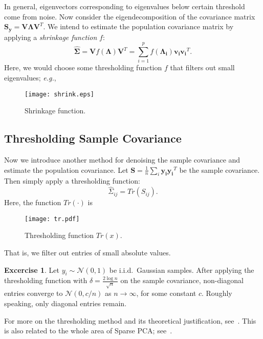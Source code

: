 \documentclass[11pt]{article}
\theoremstyle{definition}
\newtheorem{excercise}{Excercise}
\begin{document}
In general, eigenvectors corresponding to eigenvalues below certain threshold come from noise. Now consider the eigendecomposition of the covariance matrix $\mathbf{S_y} = \mathbf{V}\bm{\Lambda} \mathbf{V}^T$. We intend to estimate the population covariance matrix by  applying a {\it shrinkage function} $f$:
\[
    \bm{ \widehat{\Sigma} }= \mathbf{V}f(\bm{\Lambda})\mathbf{V}^T = \sum_{i=1}^p f(\bm{\Lambda_i})\mathbf{v_i} \mathbf{v_i}^T.
\]
Here, we would choose some thresholding function $f$ that filters out small eigenvalues; \textit{e.g.},
\begin{figure}[htbp]
    \centering
    \texttt{[image: shrink.eps]}
    \caption{Shrinkage function.}
\end{figure}

\subsection{Thresholding Sample Covariance}
Now we introduce another method for denoising the sample covariance and estimate the population covariance. Let $\mathbf{S}= \frac{1}{n}\sum_{i}\mathbf{y_i}\mathbf{y_i}^T$ be the sample covariance. Then simply apply a thresholding function: $$\widehat{\Sigma}_{ij} = Tr(S_{ij}).$$ Here, the function $Tr(\cdot)$ is 
\begin{figure}[htbp]
    \centering
    \texttt{[image: tr.pdf]}
    \caption{Thresholding function $Tr(x)$.}
\end{figure}

That is, we filter out entries of small absolute values.
\begin{excercise}
    Let $y_i\sim \mathcal{N}(0,1)$ be i.i.d.\ Gaussian samples. After applying the thresholding function with $\delta = \frac{2\log n}{\sqrt{n}}$ on the sample covariance,  non-diagonal entries converge to $\mathcal{N}(0,c/n)$ as $n\rightarrow \infty$, for some constant $c$. Roughly speaking, only diagonal entries remain.
\end{excercise}

For more on the thresholding method and its theoretical justification, see~\cite{bickel2008covariance}. This is also related to the whole area of Sparse PCA; see~\cite{johnstone2009consistency}.
\end{document}
